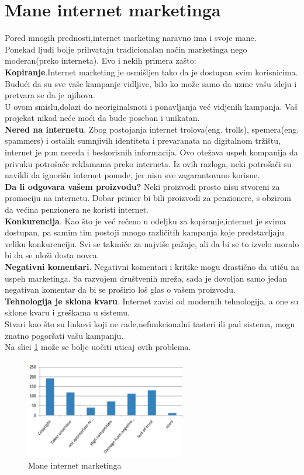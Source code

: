 \documentclass[a4paper]{article}
\begin{document}
{\section{Mane internet marketinga}
\label{sec:mane}
Pored mnogih prednosti,internet marketing naravno ima i svoje mane.
\\Ponekad ljudi bolje prihvataju tradicionalan način marketinga nego moderan(preko interneta). Evo i nekih primera zašto:
\\\textbf{Kopiranje}.Internet marketing je osmišljen tako da je dostupan svim korisnicima. Budući da su sve vaše kampanje vidljive, bilo ko može samo da uzme vašu ideju i pretvara se da je njihova.
\\U ovom smislu,dolazi do neoriginalsnoti i ponavljanja već vidjenih kampanja. Vaš projekat nikad neće moći da bude poseban i unikatan.
\\\textbf{Nered na internetu}.
Zbog postojanja internet trolova(eng. trolls), spemera(eng. spammers) i ostalih sumnjivih identiteta i prevaranata na digitalnom tržištu, internet je pun nereda i beskorisnih informacija. Ovo otežava uspeh kompanija da privuku potrošače reklamama preko interneta. Iz ovih razloga, neki potrošači su navikli da ignorišu internet ponude, jer nisu sve zagarantovano korisne.
\\\textbf{Da li odgovara vašem proizvodu?}
Neki proizvodi prosto nisu stvoreni za promociju na internetu. Dobar primer bi bili proizvodi za penzionere, s obzirom da većina penzionera ne koristi internet.
\\\textbf{Konkurencija}.
Kao što je već rečeno u odeljku za kopiranje,internet je svima dostupan, pa samim tim postoji mnogo različitih kampanja koje predstavljaju veliku konkurenciju. Svi se takmiče za najviše pažnje, ali da bi se to izvelo moralo bi da se uloži dosta novca.
\\\textbf{Negativni komentari}.
Negativni komentari i kritike mogu drastično da utiču na uspeh marketinga. Sa razvojem društvenih mreža, sada je dovoljan samo jedan negativan komentar da bi se proširio loš glas o vašem proizvodu.
\\\textbf{Tehnologija je sklona kvaru}.
 Internet zavisi od modernih tehnologija, a one su sklone kvaru i greškama u sistemu.
\\Stvari kao što su linkovi koji ne rade,nefunkcionalni tasteri ili pad sistema, mogu znatno pogoršati vašu kampanju.
\cite{prednosti i mane}
\\Na slici \ref{fig:mane} može se bolje uočiti uticaj ovih problema.
\begin{figure}[h!]
\begin{center}
\includegraphics[width=7cm]{slika.mane.marketinga.jpg}
\end{center}
\caption{Mane internet marketinga}
\label{fig:mane}
\end{figure}
\label{fig:mane}
}
\end{document}

